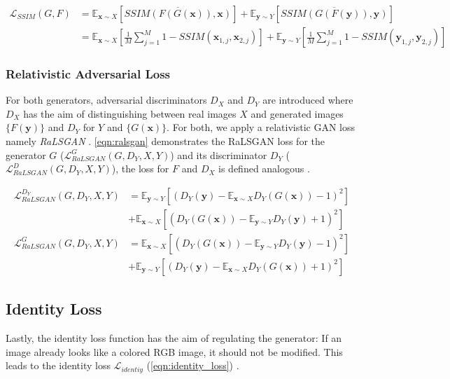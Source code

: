 \documentclass[a4paper,11pt, DIV=12]{scrartcl}
\newcommand{\x}{\boldsymbol{x}}
\newcommand{\y}{\boldsymbol{y}}
\begin{document}
\begin{equation}
   \label{eqn:ssim_loss}
   \begin{aligned}
      \mathcal{L}_{SSIM}(G,F) & = \mathbb{E}_{\x \sim X}\left[\overline{SSIM(F(G(\x)), \x)}\right] + \mathbb{E}_{\y \sim Y}\left[\overline{SSIM(G(F(\y)), \y)}\right] \\
                              & = \mathbb{E}_{\x \sim X}\left[\frac{1}{M}\sum_{j=1}^{M}1 - SSIM(\x_{1,j},\x_{2,j})\right] +
      \mathbb{E}_{\y \sim Y}\left[\frac{1}{M}\sum_{j=1}^{M}1 - SSIM(\y_{1,j},\y_{2,j})\right]
   \end{aligned}
\end{equation}


\subsubsection*{Relativistic Adversarial Loss}
For both generators, adversarial discriminators $D_X$ and $D_Y$ are introduced where $D_X$ has the aim of distinguishing between real images
$X$ and generated images $\{F(\y)\}$ and $D_Y$ for $Y$ and $\{G(\x)\}$.
For both, we apply a relativistic GAN loss namely \textit{RaLSGAN} \cite{mehri2019colorizing,rel_gan}.
\autoref{eqn:ralsgan} demonstrates the RaLSGAN loss for the generator $G$ ($\mathcal{L}^G_{RaLSGAN}(G,D_Y,X,Y)$) and its discriminator
$D_Y$ ($\mathcal{L}^D_{RaLSGAN}(G,D_Y,X,Y)$), the loss for $F$ and $D_X$ is defined analogous \cite*{rel_gan}.

\begin{equation}
   \label{eqn:ralsgan}
   \begin{aligned}
      \mathcal{L}^{D_Y}_{RaLSGAN}(G,D_Y,X,Y) & = \mathbb{E}_{\y \sim Y}\left[(D_Y(\y) - \mathbb{E}_{\x \sim X} D_Y(G(\x)) - 1)^2 \right] \\
                                             & + \mathbb{E}_{\x \sim X}\left[(D_Y(G(\x)) - \mathbb{E}_{\y \sim Y} D_Y(\y) + 1)^2 \right] \\
      \mathcal{L}^G_{RaLSGAN}(G,D_Y,X,Y)     & = \mathbb{E}_{\x \sim X}\left[(D_Y(G(\x)) - \mathbb{E}_{\y \sim Y} D_Y(\y) - 1)^2 \right] \\
                                             & + \mathbb{E}_{\y \sim Y}\left[(D_Y(\y) - \mathbb{E}_{\x \sim X} D_Y(G(\x)) + 1)^2 \right]
   \end{aligned}
\end{equation}

\subsection*{Identity Loss}
Lastly, the identity loss function has the aim of regulating the generator:
If an image already looks like a colored RGB image, it should not be modified.
This leads to the identity loss $\mathcal{L}_{identiy}$ (\autoref{eqn:identity_loss}) \cite{mehri2019colorizing}.
\end{document}

